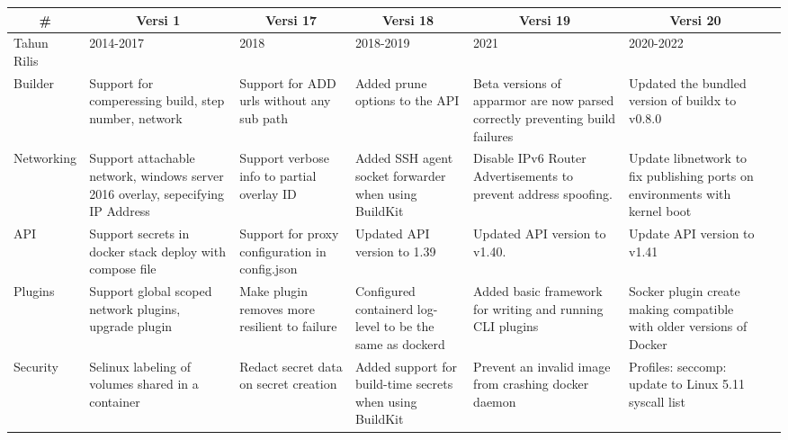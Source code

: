 \begin{table}[]
\begin{tabular}{ |p{1.7cm}|p{1.6cm}|p{1.6cm}|p{1.6cm}|p{1.6cm}|p{1.6cm}|p{1.6cm}|  }
\hline
\multicolumn{1}{c}{\#}          & \multicolumn{1}{c}{Versi 1}   & \multicolumn{1}{c}{Versi 17} & \multicolumn{1}{c}{Versi 18}  & \multicolumn{1}{c}{Versi 19} & \multicolumn{1}{c}{Versi 20}  \\
\hline
Tahun Rilis & 2014-2017 & 2018     & 2018-2019 & 2021     & 2020-2022 \\
\hline
Builder     & Support for comperessing build, step number, network & Support for ADD urls without any sub path & Added prune options to the API  & Beta versions of apparmor are now parsed correctly preventing build failures         & Updated the bundled version of buildx to v0.8.0          \\
\hline
Networking  & Support attachable network, windows server 2016 overlay, sepecifying IP Address          & Support verbose info to partial overlay ID         &  Added SSH agent socket forwarder when using BuildKit         & Disable IPv6 Router Advertisements to prevent address spoofing.         &  Update libnetwork to fix publishing ports on environments with kernel boot          \\
\hline
 API  & Support secrets in docker stack deploy with compose file        &  Support for proxy configuration in config.json        &   Updated API version to 1.39        & Updated API version to v1.40.         & Update API version to v1.41          \\
\hline
Plugins     & Support global scoped network plugins, upgrade plugin      &  Make plugin removes more resilient to failure        & Configured containerd log-level to be the same as dockerd          & Added basic framework for writing and running CLI plugins         &  Socker plugin create making compatible with older versions of Docker         \\
\hline
Security    & Selinux labeling of volumes shared in a container         & Redact secret data on secret creation & Added support for build-time secrets when using BuildKit          & Prevent an invalid image from crashing docker daemon         & Profiles: seccomp: update to Linux 5.11 syscall list          \\
\hline
\end{tabular}
\end{table}